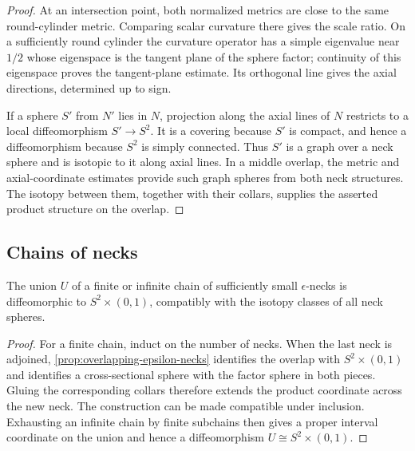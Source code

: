 \begin{proof}
At an intersection point, both normalized metrics are close to the same
round-cylinder metric.  Comparing scalar curvature there gives the scale
ratio.  On a sufficiently round cylinder the curvature operator has a
simple eigenvalue near $1/2$ whose eigenspace is the tangent plane of the
sphere factor; continuity of this eigenspace proves the tangent-plane
estimate.  Its orthogonal line gives the axial directions, determined up
to sign.

If a sphere $S'$ from $N'$ lies in $N$, projection along the axial lines of
$N$ restricts to a local diffeomorphism $S'\to S^2$.  It is a covering
because $S'$ is compact, and hence a diffeomorphism because $S^2$ is simply
connected.  Thus $S'$ is a graph over a neck sphere and is isotopic to it
along axial lines.  In a middle overlap, the metric and axial-coordinate
estimates provide such graph spheres from both neck structures.  The
isotopy between them, together with their collars, supplies the asserted
product structure on the overlap.
\end{proof}

\subsection{Chains of necks}

\begin{lemma}
\label{lem:neck-chain-product}
\notready
The union $U$ of a finite or infinite chain of sufficiently small
$\epsilon$-necks is diffeomorphic to $S^2\times(0,1)$, compatibly with
the isotopy classes of all neck spheres.
\end{lemma}

\begin{proof}
For a finite chain, induct on the number of necks.  When the last neck is
adjoined, \ref{prop:overlapping-epsilon-necks} identifies the overlap with
$S^2\times(0,1)$ and identifies a cross-sectional sphere with the factor
sphere in both pieces.  Gluing the corresponding collars therefore extends
the product coordinate across the new neck.  The construction can be made
compatible under inclusion.  Exhausting an infinite chain by finite
subchains then gives a proper interval coordinate on the union and hence a
diffeomorphism $U\cong S^2\times(0,1)$.
\end{proof}

